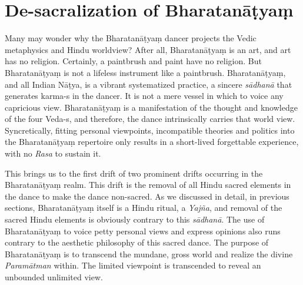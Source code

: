 \section*{De-sacralization of Bharatanāṭyaṃ}

Many may wonder why the Bharatanāṭyaṃ dancer projects the Vedic metaphysics and Hindu worldview? After all, Bharatanāṭyaṃ is an art, and art has no religion. Certainly, a paintbrush and paint have no religion. But Bharatanāṭyaṃ is not a lifeless instrument like a paintbrush. Bharatanāṭyaṃ, and all Indian Nāṭya, is a vibrant systematized practice, a sincere \textit{sādhanā} that generates karma-s in the dancer. It is not a mere vessel in which to voice any capricious view. Bharatanāṭyaṃ is a manifestation of the thought and knowledge of the four Veda-s, and therefore, the dance intrinsically carries that world view. Syncretically, fitting personal viewpoints, incompatible theories and politics into the Bharatanāṭyaṃ repertoire only results in a short-lived forgettable experience, with no \textit{Rasa} to sustain it.

This brings us to the first drift of two prominent drifts occurring in the Bharatanāṭyaṃ realm. This drift is the removal of all Hindu sacred elements in the dance to make the dance non-sacred. As we discussed in detail, in previous sections, Bharatanāṭyaṃ itself is a Hindu ritual, a \textit{Yajña}, and removal of the sacred Hindu elements is obviously contrary to this \textit{sādhanā}. The use of Bharatanāṭyaṃ to voice petty personal views and express opinions also runs contrary to the aesthetic philosophy of this sacred dance. The purpose of Bharatanāṭyaṃ is to transcend the mundane, gross world and realize the divine \textit{Paramātman} within. The limited viewpoint is transcended to reveal an unbounded unlimited view.

